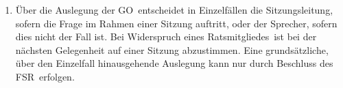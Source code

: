 \documentclass[a4paper, 12pt, ngerman]{article}
\newcommand{\rates}{FSR}
\newcommand{\go}{GO}
\newcommand{\mitgliedes}{Ratsmitgliedes}
\begin{document}
\begin{enumerate}[leftmargin=0cm]
	
	\item {}
	
	 Über die Auslegung der \go~entscheidet in Einzelfällen die Sitzungsleitung, sofern die Frage im Rahmen einer Sitzung auftritt, oder der Sprecher, sofern dies nicht der Fall ist. Bei Widerspruch eines \mitgliedes~ist bei der nächsten Gelegenheit auf einer Sitzung abzustimmen. Eine grundsätzliche, 
	 über den Einzelfall hinausgehende Auslegung kann nur durch Beschluss des \rates~erfolgen.			
	\end{enumerate}
\end{document}
